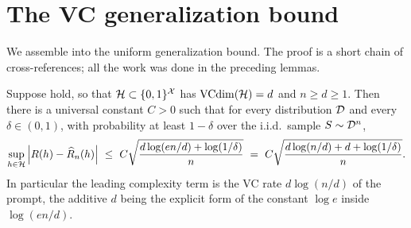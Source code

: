 \section{The VC generalization bound}\label{sec:main}

We assemble  into the uniform generalization bound. The proof is a short
chain of cross-references; all the work was done in the preceding lemmas.

\begin{theorem}\label{thm:vc-bound}
Suppose  hold, so that $\mathcal{H}\subset\{0,1\}^{\mathcal{X}}$ has
$\operatorname{VCdim}(\mathcal{H})=d$ and $n\ge d\ge1$. Then there is a universal constant $C>0$ such
that for every distribution $\mathcal{D}$ and every $\delta\in(0,1)$, with probability
at least $1-\delta$ over the i.i.d.\ sample $S\sim\mathcal{D}^{n}$,
\begin{align}\label{eq:vc-bound}
\sup_{h\in\mathcal{H}}\left| R(h)-\widehat{R}_n(h) \right|
\ \le\ C\sqrt{\frac{d\log(en/d)+\log(1/\delta)}{n}}
\ =\ C\sqrt{\frac{d\log(n/d)+d+\log(1/\delta)}{n}}.
\end{align}
In particular the leading complexity term is the VC rate $d\log(n/d)$ of the
prompt, the additive $d$ being the explicit form of the constant
$\log e$ inside $\log(en/d)$.
\end{theorem}

